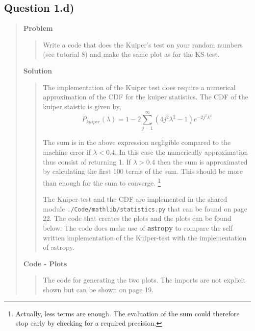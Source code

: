 \subsection*{\textbf{Question 1.d)}}
\begin{quote}

\textbf{Problem}
\begin{quote}
Write a code that does the Kuiper’s test on your random numbers (see tutorial
8) and make the same plot as for the KS-test.
\end{quote}

\textbf{Solution} 
\begin{quote}
The implementation of the Kuiper test does require a numerical approximation of the CDF for the kuiper statistics. The CDF of the kuiper staistic is given by, 
\begin{equation}
P_{kuiper}( \lambda) =  1 - 2  \sum_{j=1}^{\infty} (4j^2 \lambda^2-1) e^{-2j^2 \lambda^2 }
\end{equation}

The sum is in the above expression negligible compared to the machine error if $\lambda < 0.4$. In this case the numerically approximation thus consist of returning 1.  If $\lambda > 0.4$ then the sum is approximated by calculating the first 100 terms of the sum. This should be more than enough for the sum to converge. \footnote{Actually, less terms are enough. The evaluation of the sum could therefore stop early by checking for a required precision. } 

The Kuiper-test and the CDF are implemented in the shared module \texttt{./Code/mathlib/statistics.py} that can be found on page 22. The code that creates the plots and the plots can be found below.  The code does make use of \textbf{astropy} to compare the self written implementation of the Kuiper-test with the implementation of astropy. 
\end{quote}

\textbf{Code - Plots}

\begin{quote}
The code for generating the two plots. The imports are not explicit shown but can be shown on page 19. 

\end{quote}


\end{quote}
